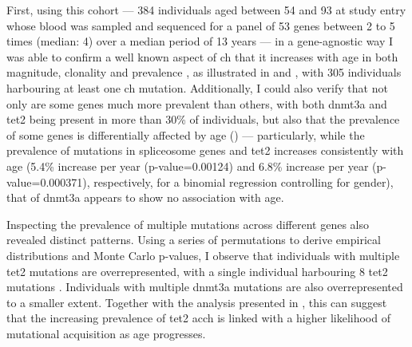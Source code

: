 First, using this cohort --- 384 individuals aged between 54 and 93 at study entry whose blood was sampled and sequenced for a panel of 53 genes between 2 to 5 times (median: 4) over a median period of 13 years --- in a gene-agnostic way I was able to confirm a well known aspect of \ac{ch} that it increases with age in both magnitude, clonality and prevalence \cite{Jaiswal2014-rl,McKerrell2015-rl}, as illustrated in  and , with 305 individuals harbouring at least one \ac{ch} mutation. Additionally, I could also verify that not only are some genes much more prevalent than others, with both \ac{dnmt3a} and \ac{tet2} being present in more than 30\% of individuals, but also that the prevalence of some genes is differentially affected by age () --- particularly, while the prevalence of mutations in spliceosome genes and \ac{tet2} increases consistently with age (5.4\% increase per year (p-value=0.00124) and 6.8\% increase per year (p-value=0.000371), respectively, for a binomial regression controlling for gender), that of \ac{dnmt3a} appears to show no association with age. 

\begin{figure}[!ht]
	\label{fig:ch-magnitude-increase}
\end{figure}

\begin{figure}[!ht]
	\label{fig:ch-prevalence-increase}
\end{figure}

\begin{figure}[!ht]
	\label{fig:ch-prevalence-genes}
\end{figure}

Inspecting the prevalence of multiple mutations across different genes also revealed distinct patterns. Using a series of permutations to derive empirical distributions and Monte Carlo p-values, I observe that individuals with multiple \ac{tet2} mutations are overrepresented, with a single individual harbouring 8 \ac{tet2} mutations . Individuals with multiple \ac{dnmt3a} mutations are also overrepresented to a smaller extent. Together with the analysis presented in , this can suggest that the increasing prevalence of \ac{tet2} ac{ch} is linked with a higher likelihood of mutational acquisition as age progresses. 

